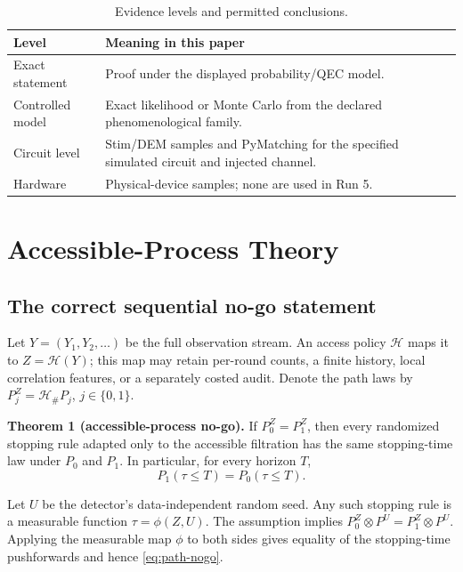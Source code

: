 \documentclass[letterpaper,journal]{IEEEtran}
\newcommand{\cH}{\mathcal H}
\begin{document}
\begin{table}[t]
\centering
\caption{Evidence levels and permitted conclusions.}
\label{tab:evidence}
\begin{tabular}{@{}p{}p{}@{}}
\toprule
Level & Meaning in this paper\\
\midrule
Exact statement & Proof under the displayed probability/QEC model.\\
Controlled model & Exact likelihood or Monte Carlo from the declared
phenomenological family.\\
Circuit level & Stim/DEM samples and PyMatching for the specified simulated
circuit and injected channel.\\
Hardware & Physical-device samples; none are used in Run 5.\\
\bottomrule
\end{tabular}
\end{table}

\section{Accessible-Process Theory}

\subsection{The correct sequential no-go statement}

Let $Y=(Y_1,Y_2,\ldots)$ be the full observation stream. An access policy
$\cH$ maps it to $Z=\cH(Y)$; this map may retain per-round counts, a finite
history, local correlation features, or a separately costed audit. Denote the
path laws by $P_j^Z=\cH_\#P_j$, $j\in\{0,1\}$.

\textbf{Theorem 1 (accessible-process no-go).}
If $P_0^Z=P_1^Z$, then every randomized stopping rule adapted only to the
accessible filtration has the same stopping-time law under $P_0$ and $P_1$.
In particular, for every horizon $T$,
\begin{equation}
P_1(\tau\leq T)=P_0(\tau\leq T).
\label{eq:path-nogo}
\end{equation}

\begin{IEEEproof}
Let $U$ be the detector's data-independent random seed. Any such stopping
rule is a measurable function $\tau=\phi(Z,U)$. The assumption implies
$P_0^Z\otimes P^U=P_1^Z\otimes P^U$. Applying the measurable map $\phi$ to
both sides gives equality of the stopping-time pushforwards and hence
\eqref{eq:path-nogo}.
\end{IEEEproof}
\end{document}
